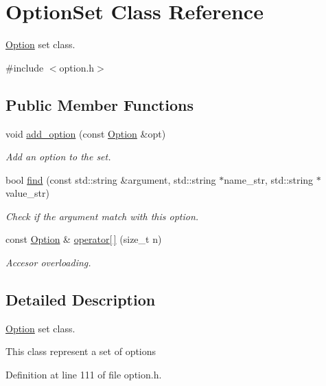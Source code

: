 \hypertarget{class_option_set}{}\section{Option\+Set Class Reference}
\label{class_option_set}


\hyperlink{class_option}{Option} set class.  




{\ttfamily \#include $<$option.\+h$>$}

\subsection*{Public Member Functions}
\begin{DoxyCompactItemize}
\item 
void \hyperlink{class_option_set_a5a83cc35d74108a6302b893c616309ca}{add\+\_\+option} (const \hyperlink{class_option}{Option} \&opt)
\begin{DoxyCompactList}\small\item\em Add an option to the set. \end{DoxyCompactList}\item 
bool \hyperlink{class_option_set_a9355623ce41d8700f25f76476d0c8b2d}{find} (const std\+::string \&argument, std\+::string $\ast$name\+\_\+str, std\+::string $\ast$value\+\_\+str)
\begin{DoxyCompactList}\small\item\em Check if the argument match with this option. \end{DoxyCompactList}\item 
const \hyperlink{class_option}{Option} \& \hyperlink{class_option_set_a1ce63868573b9592b217057bc95ba7bd}{operator\mbox{[}$\,$\mbox{]}} (size\+\_\+t n)
\begin{DoxyCompactList}\small\item\em Accesor overloading. \end{DoxyCompactList}\end{DoxyCompactItemize}


\subsection{Detailed Description}
\hyperlink{class_option}{Option} set class. 

This class represent a set of options 

Definition at line 111 of file option.\+h.




